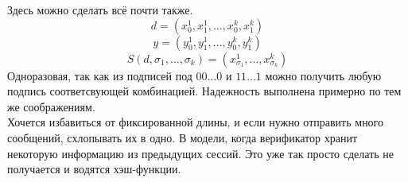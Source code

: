 \documentclass[a4paper]{article}
\theoremstyle{definition}
\theoremstyle{plain}
\begin{document}
Здесь можно сделать всё почти также.
$$
	d = (x_0^{1}, x_{1}^{1}, \ldots, x_{0}^{k}, x_{1}^{k})
$$
$$
	y = (y_0^{1}, y_{1}^{1}, \ldots, y_{0}^{k}, y_{1}^{k})
$$
$$
	S(d, \sigma_1, \ldots, \sigma_k) = (x_{\sigma_1}^1, \ldots, x_{\sigma_k}^k)
$$
Одноразовая, так как из подписей под $00\ldots 0$ и $11\ldots 1$ можно получить любую
подпись соответсвующей комбинацией. Надежность выполнена примерно по тем же соображениям.~\\

\noindent Хочется избавиться от фиксированной длины, и если нужно
отправить много сообщений, схлопывать их в одно. В модели, когда верификатор хранит
некоторую информацию из предыдущих сессий. Это уже так просто сделать не получается и
водятся хэш-функции.
\end{document}
